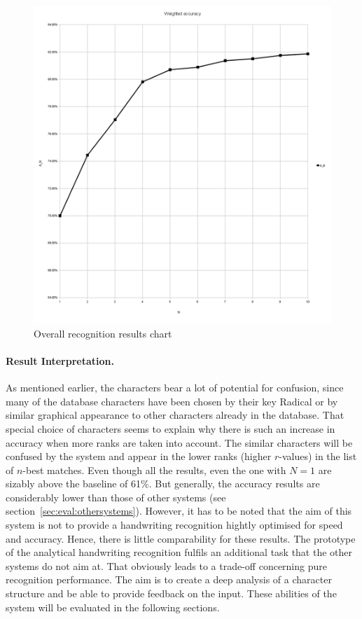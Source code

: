 \begin{figure}[htbp]
  \begin{center}
    \includegraphics[scale=0.5]{images/weightedAccuracyOverall.png}
    \caption{Overall recognition results chart}
    \label{fig:eval:overallrecognitionresults}
  \end{center}
\end{figure}

\paragraph{Result Interpretation.}
As mentioned earlier, the characters bear a lot of potential for confusion,
since many of the database characters have been chosen by their key Radical
or by similar graphical appearance to other characters already in the database.
That special choice of characters seems to explain why there is such an
increase in accuracy when more ranks are taken into account.
The similar characters will be confused by the system and appear in
the lower ranks (higher \(r\)-values) in the list of \(n\)-best matches.
Even though all the results, even the one with \(N = 1\) are sizably above
the baseline of 61\%.
But generally, the accuracy results are considerably lower than those of other
systems (see section~\ref{sec:eval:othersystems}). 
However, it has to be noted that the aim of this system is not 
to provide a handwriting recognition hightly optimised for speed and accuracy.
Hence, there is little comparability for these results. 
The prototype of the analytical handwriting recognition fulfils an additional 
task that the other systems do not aim at. That obviously leads to a trade-off
concerning pure recognition performance.
The aim is to create a deep analysis of a character structure and
be able to provide feedback on the input. These abilities of the system will
be evaluated in the following sections.

